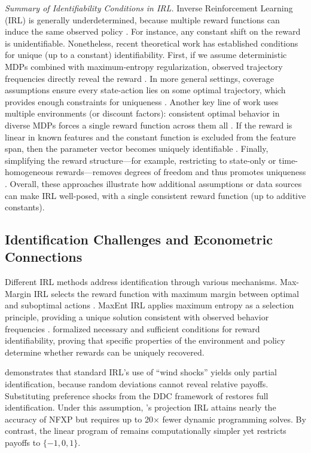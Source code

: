 \emph{Summary of Identifiability Conditions in IRL.} Inverse Reinforcement Learning (IRL) is generally underdetermined, because multiple reward functions can induce the same observed policy \citep{kim2021irl}. For instance, any constant shift on the reward is unidentifiable. Nonetheless, recent theoretical work has established conditions for unique (up to a constant) identifiability. First, if we assume deterministic MDPs combined with maximum-entropy regularization, observed trajectory frequencies directly reveal the reward \citep{kim2021irl}. In more general settings, coverage assumptions ensure every state-action lies on some optimal trajectory, which provides enough constraints for uniqueness \citep{kim2021irl}. Another key line of work uses multiple environments (or discount factors): consistent optimal behavior in diverse MDPs forces a single reward function across them all \citep{cao2021irl,rolland2022_identifiability}. If the reward is linear in known features and the constant function is excluded from the feature span, then the parameter vector becomes uniquely identifiable \citep{rolland2022,shehab2024}. Finally, simplifying the reward structure---for example, restricting to state-only or time-homogeneous rewards---removes degrees of freedom and thus promotes uniqueness \citep{cao2021irl}. Overall, these approaches illustrate how additional assumptions or data sources can make IRL well-posed, with a single consistent reward function (up to additive constants). 

\subsection{Identification Challenges and Econometric Connections}

Different IRL methods address identification through various mechanisms. Max-Margin IRL selects the reward function with maximum margin between optimal and suboptimal actions \citep{Ratliff2006}. MaxEnt IRL applies maximum entropy as a selection principle, providing a unique solution consistent with observed behavior frequencies \citep{Ziebart2008}. \citet{kim2021irl} formalized necessary and sufficient conditions for reward identifiability, proving that specific properties of the environment and policy determine whether rewards can be uniquely recovered.

\citet{OBriant2024} demonstrates that standard IRL’s use of “wind shocks” yields only partial identification, because random deviations cannot reveal relative payoffs. Substituting preference shocks from the DDC framework of \citet{Rust1987} restores full identification. Under this assumption, \citet{Abbeel2004}’s projection IRL attains nearly the accuracy of NFXP but requires up to 20× fewer dynamic programming solves. By contrast, the linear program of \citet{NgRussell2000} remains computationally simpler yet restricts payoffs to \(\{-1, 0, 1\}\).


